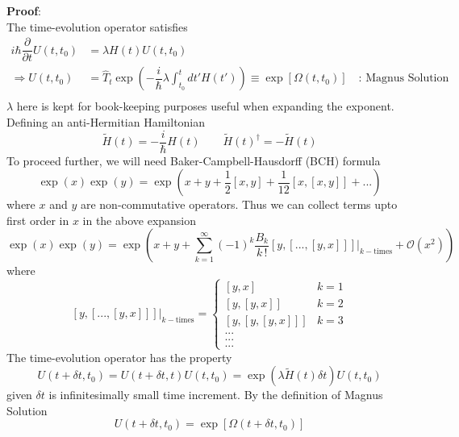 \documentclass[aps,prb,onecolumn,notitlepage,showpacs,floatfix,superscriptaddress]{revtex4-1}
\begin{document}
\textbf{Proof}:\\
The time-evolution operator satisfies
\begin{equation}
\begin{split}
i\hbar \dfrac{\partial}{\partial t} U(t,t_0) & = \lambda H(t) U(t,t_0) \\
\Rightarrow U(t,t_0) & = \hat{T}_t \exp \left(-\dfrac{i}{\hbar} \lambda \int_{t_0}^t dt'  H(t') \right) \equiv  \exp\left[\Omega(t,t_0) \right]\quad  \textrm{: Magnus Solution}\\
\end{split}
\end{equation}
$\lambda$ here is kept for book-keeping purposes useful when expanding the exponent. Defining an anti-Hermitian Hamiltonian 
\begin{equation}
\tilde{H}(t) = -\dfrac{i}{\hbar} H(t) \qquad \tilde{H}(t)^\dagger = -\tilde{H}(t)
\end{equation}
To proceed further, we will need Baker-Campbell-Hausdorff (BCH) formula
\begin{equation}
\exp(x) \exp(y) = \exp\left(x+y+\dfrac{1}{2} [x,y] +\dfrac{1}{12} \left[ x,[x,y]\right] + ... \right)
\end{equation}
where $x$ and $y$ are non-commutative operators. Thus we can collect terms upto first order in $x$ in the above expansion
\begin{equation}
\exp(x) \exp(y) = \exp\left(x+y+\sum_{k=1}^{\infty}(-1)^k \dfrac{B_k}{k\, !} \left[y,\left[...,[y,x]\right]\right] \bigg\vert_{k-\mathrm{times}}+ \mathcal{O}(x^2) \right)
\end{equation}
where
\[\left[y,\left[...,[y,x]\right]\right] \bigg\vert_{k-\mathrm{times}}= \begin{cases} 
      [y,x] & k=1 \\
      \left[ y,[y,x]\right] & k=2 \\
      \left[ y,\left[y,[y,x]\right]\right] & k=3 \\
      ...\\
      ...\\
      ...
   \end{cases}
\]
The time-evolution operator has the property
\begin{equation}
U(t+\delta t,t_0)=U(t+\delta t,t)U(t,t_0) = \exp\left(\lambda \tilde{H}(t) \delta t \right)U(t,t_0)
\end{equation}
given $\delta t$ is infinitesimally small time increment. By the definition of Magnus Solution
\begin{equation}
U(t+\delta t,t_0) = \exp\left[\Omega(t+\delta t,t_0) \right]
\end{equation}
\end{document}
